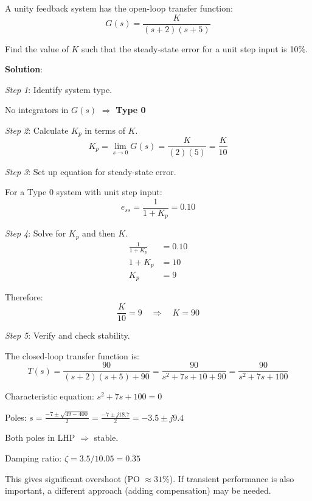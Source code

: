\vspace{1em}

\begin{examplebox}
A unity feedback system has the open-loop transfer function:
\begin{equation}
    G(s) = \frac{K}{(s+2)(s+5)}
\end{equation}

Find the value of $K$ such that the steady-state error for a unit step input is 10\%.

\textbf{Solution}:

\textit{Step 1}: Identify system type.

No integrators in $G(s)$ $\Rightarrow$ \textbf{Type 0}

\textit{Step 2}: Calculate $K_p$ in terms of $K$.
\begin{equation}
    K_p = \lim_{s\to 0} G(s) = \frac{K}{(2)(5)} = \frac{K}{10}
\end{equation}

\textit{Step 3}: Set up equation for steady-state error.

For a Type 0 system with unit step input:
\begin{equation}
    e_{ss} = \frac{1}{1 + K_p} = 0.10
\end{equation}

\textit{Step 4}: Solve for $K_p$ and then $K$.
\begin{align}
    \frac{1}{1 + K_p} &= 0.10 \\
    1 + K_p &= 10 \\
    K_p &= 9
\end{align}

Therefore:
\begin{equation}
    \frac{K}{10} = 9 \quad \Rightarrow \quad \boxed{K = 90}
\end{equation}

\textit{Step 5}: Verify and check stability.

The closed-loop transfer function is:
\begin{equation}
    T(s) = \frac{90}{(s+2)(s+5) + 90} = \frac{90}{s^2 + 7s + 10 + 90} = \frac{90}{s^2 + 7s + 100}
\end{equation}

Characteristic equation: $s^2 + 7s + 100 = 0$

Poles: $s = \frac{-7 \pm \sqrt{49-400}}{2} = \frac{-7 \pm j18.7}{2} = -3.5 \pm j9.4$

Both poles in LHP $\Rightarrow$ stable.

Damping ratio: $\zeta = 3.5/10.05 = 0.35$

This gives significant overshoot (PO $\approx 31\%$). If transient performance is also important, a different approach (adding compensation) may be needed.
\end{examplebox}

